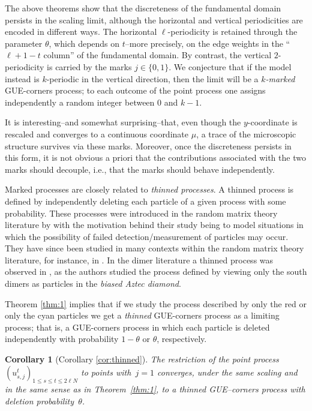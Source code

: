\documentclass[11pt]{article}
\theoremstyle{plain}
\newtheorem{corollary}[theorem]{Corollary}
\theoremstyle{definition}
\numberwithin{equation}{section}
\begin{document}
The above theorems show that the discreteness of the fundamental domain persists in the scaling limit, although the horizontal and vertical periodicities are encoded in different ways. The horizontal $\ell$-periodicity is retained through the parameter $\theta$, which depends on $t$--more precisely, on the edge weights in the ``$\ell+1-t$ column'' of the fundamental domain. By contrast, the vertical $2$-periodicity is carried by the marks $j\in\{0,1\}$. We conjecture that if the model instead is $k$-periodic in the vertical direction, then the limit will be a \textit{$k$-marked} GUE-corners process; to each outcome of the point process one assigns independently a random integer between $0$ and $k-1$.


It is interesting--and somewhat surprising--that, even though the $y$-coordinate is rescaled and converges to a continuous coordinate $\mu$, a trace of the microscopic structure survives via these marks. Moreover, once the discreteness persists in this form, it is not obvious a priori that the contributions associated with the two marks should decouple, i.e., that the marks should behave independently.

%
%
%
Marked processes are closely related to \emph{thinned processes}. A thinned process is defined by independently deleting each particle of a given process with some probability. These processes were introduced in the random matrix theory literature by \cite{BP06, BP04} with the motivation behind their study being to model situations in which the possibility of failed detection/measurement of particles may occur. They have since been studied in many contexts within the random matrix theory literature, for instance, in \cite{BD17, Bot17, CC17}. 
%
%
In the dimer literature a thinned process was observed in \cite{CJY15}, as the authors studied the process defined by viewing only the south dimers as particles in the \emph{biased Aztec diamond}.

Theorem \ref{thm:1} implies that if we study the process described by only the red or only the cyan particles we get a \textit{thinned} GUE-corners process as a limiting process; that is, a GUE-corners process in which each particle is deleted independently with probability $1-\theta$ or $\theta$, respectively.  

%
%

\begin{corollary}[Corollary \ref{cor:thinned}]\label{maincor:1} 
The restriction of the point process~$(u_{s,j}^t)_{1\leq s\leq t\leq 2\ell N}$ to points with~$j=1$ converges, under the same scaling and in the same sense as in Theorem~\ref{thm:1}, to a thinned GUE–corners process with deletion probability~$\theta$.
\end{corollary}
\end{document}
